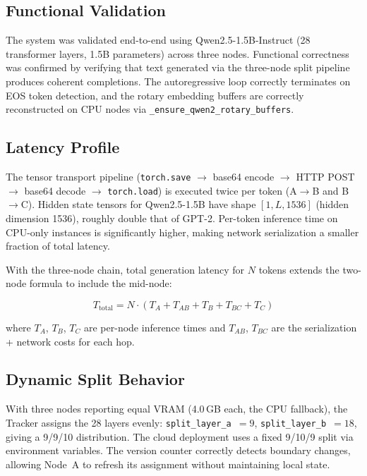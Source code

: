 \documentclass[conference]{IEEEtran}
\begin{document}
\subsection{Functional Validation}

The system was validated end-to-end using Qwen2.5-1.5B-Instruct (28
transformer layers, 1.5B parameters) across three nodes. Functional correctness
was confirmed by verifying that text generated via the three-node split pipeline
produces coherent completions. The autoregressive loop correctly terminates on
EOS token detection, and the rotary embedding buffers are correctly reconstructed
on CPU nodes via \texttt{\_ensure\_qwen2\_rotary\_buffers}.

\subsection{Latency Profile}

The tensor transport pipeline
(\texttt{torch.save} $\to$ base64 encode $\to$ HTTP POST $\to$ base64 decode
$\to$ \texttt{torch.load}) is executed twice per token (A$\to$B and B$\to$C).
Hidden state tensors for Qwen2.5-1.5B have shape $[1, L, 1536]$ (hidden
dimension 1536), roughly double that of GPT-2. Per-token inference time on
CPU-only instances is significantly higher, making network serialization a
smaller fraction of total latency.

With the three-node chain, total generation latency for $N$ tokens extends
the two-node formula to include the mid-node:

\begin{equation}
  T_{\text{total}} = N \cdot \left(T_A + T_{AB} + T_B + T_{BC} + T_C\right)
  \label{eq:latency}
\end{equation}

where $T_A$, $T_B$, $T_C$ are per-node inference times and $T_{AB}$,
$T_{BC}$ are the serialization + network costs for each hop.

\subsection{Dynamic Split Behavior}

With three nodes reporting equal VRAM (4.0\,GB each, the CPU fallback),
the Tracker assigns the 28 layers evenly: \texttt{split\_layer\_a}~$= 9$,
\texttt{split\_layer\_b}~$= 18$, giving a 9/9/10 distribution. The cloud
deployment uses a fixed 9/10/9 split via environment variables. The version
counter correctly detects boundary changes, allowing Node~A to refresh its
assignment without maintaining local state.
\end{document}
